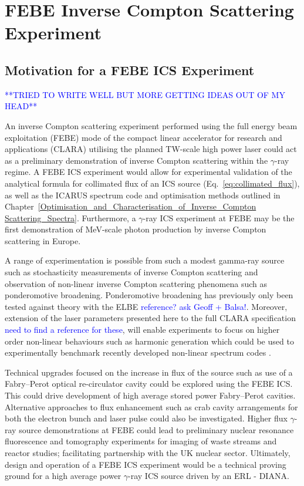 \documentclass[../main.tex]{subfiles}
\begin{document}
\chapter{FEBE Inverse Compton Scattering Experiment}
\label{FEBE_Inverse_Compton_Scattering_Experiment} %

\section{Motivation for a FEBE ICS Experiment}
\textcolor{blue}{**TRIED TO WRITE WELL BUT MORE GETTING IDEAS OUT OF MY HEAD**}

An inverse Compton scattering experiment performed using the full energy beam exploitation (FEBE) mode of the compact linear accelerator for research and applications (CLARA) utilising the planned \si{\tera\watt}-scale high power laser could act as a preliminary demonstration of inverse Compton scattering within the $\gamma$-ray regime. A FEBE ICS experiment would allow for experimental validation of the analytical formula for collimated flux of an ICS source (Eq.~\ref{eq:collimated_flux}), as well as the \textsc{ICARUS} spectrum code and optimisation methods outlined in Chapter~\ref{Optimisation_and_Characterisation_of_Inverse_Compton Scattering_Spectra}. Furthermore, a $\gamma$-ray ICS experiment at FEBE may be the first demonstration of \si{\mega\electronvolt}-scale photon production by inverse Compton scattering in Europe.

A range of experimentation is possible from such a modest gamma-ray source such as stochasticity measurements of inverse Compton scattering and observation of non-linear inverse Compton scattering phenomena such as ponderomotive broadening. Ponderomotive broadening has previously only been tested against theory \cite{krafft2004spectral} with the ELBE \cite{} \textcolor{blue}{reference? ask Geoff + Balsa!}. Moreover, extension of the laser parameters presented here to the full CLARA specification \cite{} \textcolor{blue}{need to find a reference for these}, will enable experiments to focus on higher order non-linear behaviours such as harmonic generation which could be used to experimentally benchmark recently developed non-linear spectrum codes \cite{terzic2019improving,terzic2021laser}.

Technical upgrades focused on the increase in flux of the source such as use of a Fabry--Perot optical re-circulator cavity could be explored using the FEBE ICS. This could drive development of high average stored power Fabry--Perot cavities. Alternative approaches to flux enhancement such as crab cavity arrangements for both the electron bunch \cite{variola2011luminosity,koshiba2018luminosity} and laser pulse could also be investigated. Higher flux $\gamma$-ray source demonstrations at FEBE could lead to preliminary nuclear resonance fluorescence and tomography experiments for imaging of waste streams and reactor studies; facilitating partnership with the UK nuclear sector. Ultimately, design and operation of a FEBE ICS experiment would be a technical proving ground for a high average power $\gamma$-ray ICS source driven by an ERL - DIANA.
\end{document}
